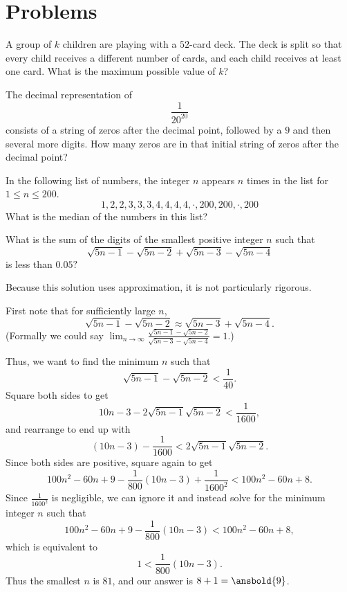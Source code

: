 \documentclass[mast]{lucky}
\begin{document}
\pagebreak

\section{Problems}

\minpt{}

\psetquote{}{}

\begin{prob}[CMC 10B 2020/4]{2}
A group of $k$ children are playing with a $52$-card deck.  The deck is split so that every child receives a different number of cards, and each child receives at least one card. What is the maximum possible value of $k$?
\end{prob}

\begin{req}[AMC 10B 2020/12]{3}
The decimal representation of \[\frac{1}{20^{20}}\] consists of a string of zeros after the decimal point, followed by a $9$ and then several more digits. How many zeros are in that initial string of zeros after the decimal point?

\end{req}

\begin{prob}[AMC 10A 2021/16]{4}
In the following list of numbers, the integer $n$ appears $n$ times in the list for $1 \leq n \leq 200$.
$$1, 2, 2, 3, 3, 3, 4, 4, 4, 4, \cdot, 200, 200, \cdot , 200$$What is the median of the numbers in this list?

\end{prob}

\begin{req}[DMC 10B 2021/23]{9}
What is the sum of the digits of the smallest positive integer $n$ such that
\[\sqrt{5n-1}-\sqrt{5n-2}+\sqrt{5n-3}-\sqrt{5n-4}\]
is less than $0.05?$
\begin{solu}
Because this solution uses approximation, it is not particularly rigorous.

First note that for sufficiently large $n$,
\[\sqrt{5n-1}-\sqrt{5n-2}\approx \sqrt{5n-3}+\sqrt{5n-4}.\]
(Formally we could say $\lim_{n\to\infty}\frac{\sqrt{5n-1}-\sqrt{5n-2}}{\sqrt{5n-3}-\sqrt{5n-4}}=1.$)

Thus, we want to find the minimum $n$ such that
\[\sqrt{5n-1}-\sqrt{5n-2}<\frac{1}{40}.\]
Square both sides to get
\[10n-3-2\sqrt{5n-1}\sqrt{5n-2}<\frac{1}{1600},\]
and rearrange to end up with
\[(10n-3)-\frac{1}{1600}<2\sqrt{5n-1}\sqrt{5n-2}.\]
Since both sides are positive, square again to get
\[100n^2-60n+9-\frac{1}{800}(10n-3)+\frac{1}{1600^2}<100n^2-60n+8.\]
Since $\frac{1}{1600^2}$ is negligible, we can ignore it and instead solve for the minimum integer $n$ such that
\[100n^2-60n+9-\frac{1}{800}(10n-3)<100n^2-60n+8,\]
which is equivalent to
\[1<\frac{1}{800}(10n-3).\]
Thus the smallest $n$ is $81$, and our answer is $8+1=\ansbold{9}$.
\end{solu}
\end{req}
\end{document}
